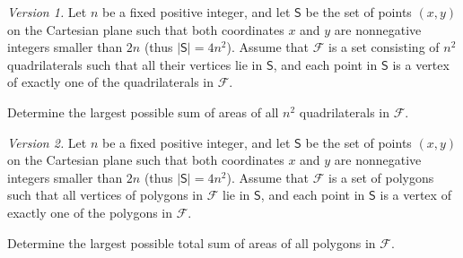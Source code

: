 \textit{Version 1.} Let $n$ be a fixed positive integer, and let $\mathsf{S}$ be the set of points $(x,y)$ on the Cartesian plane such that both coordinates $x$ and $y$ are nonnegative integers smaller than $2n$ (thus $|\mathsf{S}| = 4n^2$). Assume that $\mathcal{F}$ is a set consisting of $n^2$ quadrilaterals such that all their vertices lie in $\mathsf{S}$, and each point in $\mathsf{S}$ is a vertex of exactly one of the quadrilaterals in $\mathcal{F}$.

Determine the largest possible sum of areas of all $n^2$ quadrilaterals in $\mathcal{F}$.

\textit{Version 2.} Let $n$ be a fixed positive integer, and let $\mathsf{S}$ be the set of points $(x,y)$ on the Cartesian plane such that both coordinates $x$ and $y$ are nonnegative integers smaller than $2n$ (thus $|\mathsf{S}| = 4n^2$). Assume that $\mathcal{F}$ is a set of polygons such that all vertices of polygons in $\mathcal{F}$ lie in $\mathsf{S}$, and each point in $\mathsf{S}$ is a vertex of exactly one of the polygons in $\mathcal{F}$.

Determine the largest possible total sum of areas of all polygons in $\mathcal{F}$.
